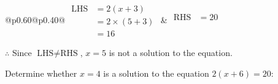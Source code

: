 \documentclass[12pt]{article}
\newcounter{minipagecount}
\begin{document}
\begin{multicols}{2}
\begin{minipage}[t]{0.40\textwidth}
    \renewcommand{\arraystretch}{1.3} %
    \begin{tabular}{@{}p{0.60\linewidth}@{}p{0.40\linewidth}@{}}
        \(\begin{aligned}
            \text{LHS} &= 2(x + 3) \\
                    &= 2 \times(5 + 3) \\
                    &= 16
        \end{aligned}\) &
        \(\begin{aligned}
            \text{RHS} &= 20\\
                    & \\
                    &
        \end{aligned}\)
    \end{tabular}
    \renewcommand{\arraystretch}{1.0} %
    \vspace{2pt}  %

    \noindent \(\therefore\) Since \(\text{LHS} \neq \text{RHS}\), \(x = 5\) is not  a solution to the equation.

\end{minipage}

 \vspace*{16pt}
\noindent{(\theminipagecount)}\hspace{0.1mm} %
\begin{minipage}[t]{0.40\textwidth} %

    \noindent Determine whether \(x = 4\) is a solution to the equation \(2(x + 6) = 20\):
    \vspace{4pt}  %

    \noindent


\end{minipage}
\end{multicols}
\end{document}
